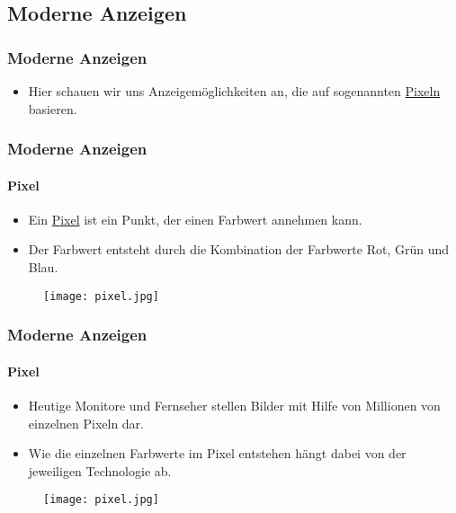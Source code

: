 \subsection{Moderne Anzeigen}

\begin{frame}
    \frametitle{Moderne Anzeigen}
    \begin{itemize}
        \item Hier schauen wir uns Anzeigemöglichkeiten an, die auf sogenannten \href{https://de.wikipedia.org/wiki/Pixel}{Pixeln} basieren.
    \end{itemize}
\end{frame}

\begin{frame}
    \frametitle{Moderne Anzeigen}
    \framesubtitle{Pixel}
    \begin{minipage}{0.5\textwidth}
        \begin{itemize}
            \item Ein \href{https://de.wikipedia.org/wiki/Pixel}{Pixel} ist ein Punkt, der einen Farbwert annehmen kann.
            \item Der Farbwert entsteht durch die Kombination der Farbwerte Rot, Grün und Blau.
        \end{itemize}
    \end{minipage} \hfill
    \begin{minipage}{0.45\textwidth}
        \begin{figure}
            \texttt{[image: pixel.jpg]}
        \end{figure}
    \end{minipage}
\end{frame}

\begin{frame}
    \frametitle{Moderne Anzeigen}
    \framesubtitle{Pixel}
    \begin{minipage}{0.5\textwidth}
        \begin{itemize}
            \item Heutige Monitore und Fernseher stellen Bilder mit Hilfe von Millionen von einzelnen Pixeln dar.
            \item Wie die einzelnen Farbwerte im Pixel entstehen hängt dabei von der jeweiligen Technologie ab.
        \end{itemize}
    \end{minipage} \hfill
    \begin{minipage}{0.45\textwidth}
        \begin{figure}
            \texttt{[image: pixel.jpg]}
        \end{figure}
    \end{minipage}
\end{frame}

